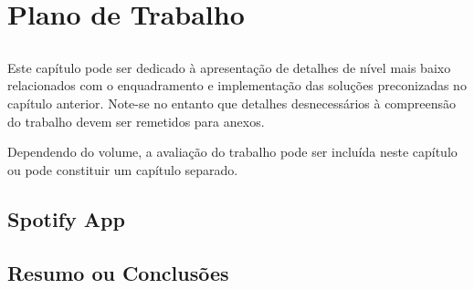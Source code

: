 
\chapter{Plano de Trabalho}\label{chap:chap4}

\section*{}

Este capítulo pode ser dedicado à apresentação de detalhes de nível
mais baixo relacionados com o enquadramento e implementação das
soluções preconizadas no capítulo anterior.
Note-se no entanto que detalhes desnecessários à compreensão do
trabalho devem ser remetidos para anexos.

Dependendo do volume, a avaliação do trabalho pode ser incluída neste
capítulo ou pode constituir um capítulo separado.

\section{Spotify App} %
\label{sec:spotify_app}

\lipsum

\lipsum


\section{Resumo ou Conclusões}

\lipsum[1]
